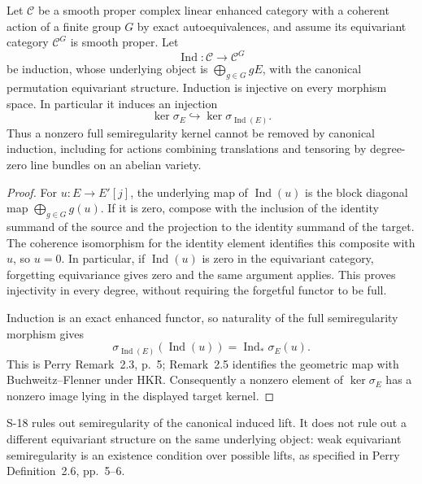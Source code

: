 \begin{proposition}
\label{prop:semireg-induction-kernel}
Let $\mathcal C$ be a smooth proper complex linear enhanced
category with a coherent action of a finite group $G$ by exact
autoequivalences, and assume its equivariant category
$\mathcal C^G$ is smooth proper. Let
\[
 \operatorname{Ind}:\mathcal C\longrightarrow\mathcal C^G
\]
be induction, whose underlying object is
$\bigoplus_{g\in G}gE$, with the canonical permutation
equivariant structure. Induction is injective on every morphism
space. In particular it induces an injection
\[
 \ker\sigma_E\hookrightarrow
       \ker\sigma_{\operatorname{Ind}(E)}.
\]
Thus a nonzero full semiregularity kernel cannot be removed by
canonical induction, including for actions combining
translations and tensoring by degree-zero line bundles on an
abelian variety.
\end{proposition}
\begin{proof}
For $u:E\to E'[j]$, the underlying map of
$\operatorname{Ind}(u)$ is the block diagonal map
$\bigoplus_{g\in G}g(u)$.
If it is zero, compose with the inclusion of the identity
summand of the source and the projection to the identity
summand of the target. The coherence isomorphism for the
identity element identifies this composite with $u$, so $u=0$.
In particular, if $\operatorname{Ind}(u)$ is zero in the
equivariant category, forgetting equivariance gives zero and
the same argument applies. This proves injectivity in every
degree, without requiring the forgetful functor to be full.

Induction is an exact enhanced functor, so naturality of the
full semiregularity morphism gives
\[
 \sigma_{\operatorname{Ind}(E)}(\operatorname{Ind}(u))
       =\operatorname{Ind}_*\sigma_E(u).
\]
This is Perry Remark~2.3, p.~5; Remark~2.5 identifies the
geometric map with Buchweitz--Flenner under HKR.
Consequently a nonzero element of $\ker\sigma_E$ has a
nonzero image lying in the displayed target kernel.
\end{proof}

S-18 rules out semiregularity of the canonical induced lift.
It does not rule out a different equivariant structure on the
same underlying object: weak equivariant semiregularity is
an existence condition over possible lifts, as specified in
Perry Definition~2.6, pp.~5--6.


